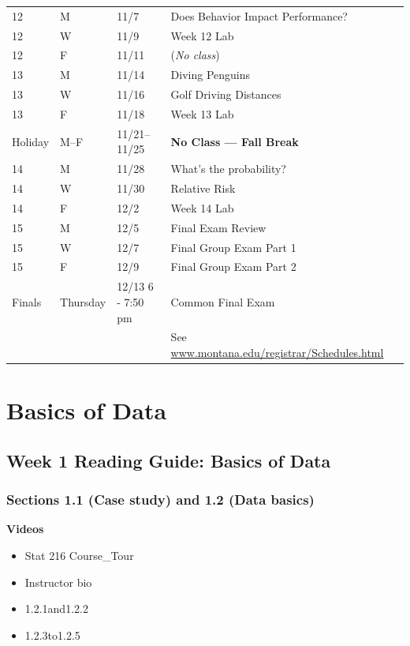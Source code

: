 \documentclass[
]{report}
\providecommand{\tightlist}{%
  \setlength{\itemsep}{0pt}\setlength{\parskip}{0pt}}
\begin{document}
\begin{longtable}{|l|l|l|l|p{}|}
12& M& 11/7& Does Behavior Impact Performance? \\*
12& W& 11/9& Week 12 Lab \\*
12& F& 11/11& (\textit{No class}) \\ \hline
13& M& 11/14& Diving Penguins  \\*
13& W& 11/16& Golf Driving Distances \\*
13& F& 11/18& Week 13 Lab \\ \hline
Holiday& M--F& 11/21--11/25& \textbf{No Class --- Fall Break} \\ \hline
14& M& 11/28& What's the probability? \\*
14& W& 11/30& Relative Risk \\*
14& F& 12/2& Week 14 Lab \\ \hline
15& M& 12/5& Final Exam Review \\*
15& W& 12/7& Final Group Exam Part 1 \\*
15& F& 12/9& Final Group Exam Part 2 \\ \hline
Finals& Thursday & 12/13 6 - 7:50 pm & Common Final Exam \\
&  &  & See \url{www.montana.edu/registrar/Schedules.html} \\ \hline

\end{longtable}

\nocite{*}

\hypertarget{basics-of-data}{%
\chapter{Basics of Data}\label{basics-of-data}}

\hypertarget{week-1-reading-guide-basics-of-data}{%
\section{Week 1 Reading Guide: Basics of Data}\label{week-1-reading-guide-basics-of-data}}

\hypertarget{sections-1.1-case-study-and-1.2-data-basics}{%
\subsection*{Sections 1.1 (Case study) and 1.2 (Data basics)}\label{sections-1.1-case-study-and-1.2-data-basics}}

\textbf{Videos}

\begin{itemize}
\tightlist
\item
  Stat 216 Course\_Tour
\item
  Instructor bio
\item
  1.2.1and1.2.2
\item
  1.2.3to1.2.5
\end{itemize}
\end{document}
